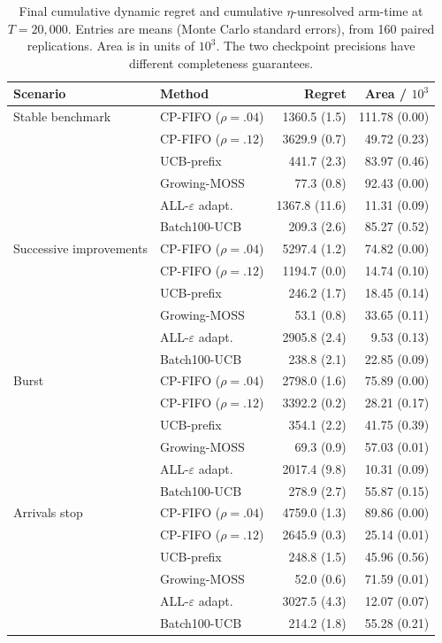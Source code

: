 \begin{table}[t]
\centering
\caption{Final cumulative dynamic regret and cumulative $\eta$-unresolved arm-time at $T=20{,}000$. Entries are means (Monte Carlo standard errors), from 160 paired replications. Area is in units of $10^3$. The two checkpoint precisions have different completeness guarantees.}
\label{tab:simulation}
\small
\begin{tabular}{llrr}
\toprule
Scenario & Method & Regret & Area / $10^3$ \\
\midrule
Stable benchmark & CP-FIFO ($\rho=.04$) & 1360.5 (1.5) & 111.78 (0.00) \\
 & CP-FIFO ($\rho=.12$) & 3629.9 (0.7) & 49.72 (0.23) \\
 & UCB-prefix & 441.7 (2.3) & 83.97 (0.46) \\
 & Growing-MOSS & 77.3 (0.8) & 92.43 (0.00) \\
 & ALL-$\varepsilon$ adapt. & 1367.8 (11.6) & 11.31 (0.09) \\
 & Batch100-UCB & 209.3 (2.6) & 85.27 (0.52) \\
\midrule
Successive improvements & CP-FIFO ($\rho=.04$) & 5297.4 (1.2) & 74.82 (0.00) \\
 & CP-FIFO ($\rho=.12$) & 1194.7 (0.0) & 14.74 (0.10) \\
 & UCB-prefix & 246.2 (1.7) & 18.45 (0.14) \\
 & Growing-MOSS & 53.1 (0.8) & 33.65 (0.11) \\
 & ALL-$\varepsilon$ adapt. & 2905.8 (2.4) & 9.53 (0.13) \\
 & Batch100-UCB & 238.8 (2.1) & 22.85 (0.09) \\
\midrule
Burst & CP-FIFO ($\rho=.04$) & 2798.0 (1.6) & 75.89 (0.00) \\
 & CP-FIFO ($\rho=.12$) & 3392.2 (0.2) & 28.21 (0.17) \\
 & UCB-prefix & 354.1 (2.2) & 41.75 (0.39) \\
 & Growing-MOSS & 69.3 (0.9) & 57.03 (0.01) \\
 & ALL-$\varepsilon$ adapt. & 2017.4 (9.8) & 10.31 (0.09) \\
 & Batch100-UCB & 278.9 (2.7) & 55.87 (0.15) \\
\midrule
Arrivals stop & CP-FIFO ($\rho=.04$) & 4759.0 (1.3) & 89.86 (0.00) \\
 & CP-FIFO ($\rho=.12$) & 2645.9 (0.3) & 25.14 (0.01) \\
 & UCB-prefix & 248.8 (1.5) & 45.96 (0.56) \\
 & Growing-MOSS & 52.0 (0.6) & 71.59 (0.01) \\
 & ALL-$\varepsilon$ adapt. & 3027.5 (4.3) & 12.07 (0.07) \\
 & Batch100-UCB & 214.2 (1.8) & 55.28 (0.21) \\
\bottomrule
\end{tabular}
\end{table}
